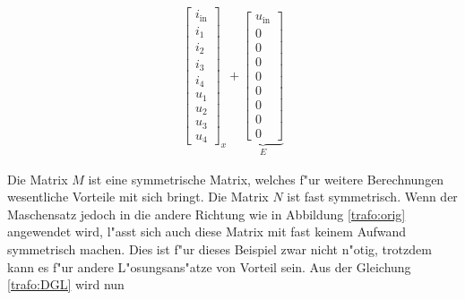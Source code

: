 \begin{refsection}
{\begin{align}
{\begin{bmatrix}
			i_\mathrm{in} \\
			i_1 \\
			i_2 \\
			i_3 \\
			i_4 \\
			u_1 \\
			u_2 \\
			u_3 \\
			u_4
			\end{bmatrix}}_{\text{$x$}}
			+
			\underbrace{\begin{bmatrix}
			u_\mathrm{in} \\
			0 \\
			0 \\
			0 \\
			0 \\
			0 \\
			0 \\
			0 \\
			0
			\end{bmatrix}}_{\text{$E$}}
			\label{trafo:DGL}
\end{align}
}
		


Die Matrix $M$ ist eine symmetrische Matrix, welches f"ur weitere Berechnungen wesentliche Vorteile mit sich bringt. Die Matrix $N$ ist fast symmetrisch. Wenn der Maschensatz jedoch in die andere Richtung wie in Abbildung \ref{trafo:orig} angewendet wird, l"asst sich auch diese Matrix mit fast keinem Aufwand symmetrisch machen. Dies ist f"ur dieses Beispiel zwar nicht n"otig, trotzdem kann es f"ur andere L"osungsans"atze von Vorteil sein. Aus der Gleichung \ref{trafo:DGL} wird nun 


\end{refsection}
